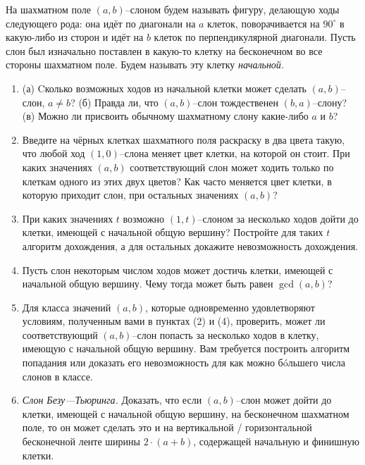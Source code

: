 \vspace{-0.35cm} 

\ms На шахматном поле $(a,b)$--слоном будем называть фигуру, делающую ходы следующего рода: она идёт по диагонали на $a$ клеток, поворачивается на $90^{\circ}$ в какую-либо из сторон и идёт на $b$ клеток по перпендикулярной диагонали. Пусть слон был изначально поставлен в какую-то клетку на бесконечном во все стороны шахматном поле. Будем называть эту клетку {\itshape начальной}.

\begin{enumerate}

\item (а) Cколько возможных ходов из начальной клетки может сделать $(a,b)$--слон, $a \ne b$? (б) Правда ли, что $(a,b)$--слон тождественен $(b,a)$--слону? (в) Можно ли присвоить обычному шахматному слону какие-либо $a$ и $b$?

\item Введите на чёрных клетках шахматного поля раскраску в два цвета такую, что любой ход $(1,0)$--слона меняет цвет клетки, на которой он стоит. При каких значениях $(a,b)$ соответствующий слон может ходить только по клеткам одного из этих двух цветов? Как часто меняется цвет клетки, в которую приходит слон, при остальных значениях $(a,b)$?

\item При каких значениях $t$ возможно $(1,t)$--слоном за несколько ходов дойти до клетки, имеющей с начальной общую вершину? Постройте для таких $t$ алгоритм дохождения, а для остальных докажите невозможность дохождения.

\item Пусть слон некоторым числом ходов может достичь клетки, имеющей с начальной общую вершину. Чему тогда может быть равен $\gcd (a,b)$?

\item Для класса значений $(a,b)$, которые одновременно удовлетворяют условиям, полученным вами в пунктах (2) и (4), проверить, может ли соответствующий $(a,b)$--слон попасть за несколько ходов в клетку, имеющую с начальной общую вершину. Вам требуется построить алгоритм попадания или доказать его невозможность для как можно б\'oльшего числа слонов в классе.

\item {\itshape Слон Безу---Тьюринга.} Доказать, что если $(a,b)$--слон может дойти до клетки, имеющей с начальной общую вершину, на бесконечном шахматном поле, то он может сделать это и на вертикальной / горизонтальной бесконечной ленте ширины $2\cdot(a+b)$, содержащей начальную и финишную клетки.


\end{enumerate}
